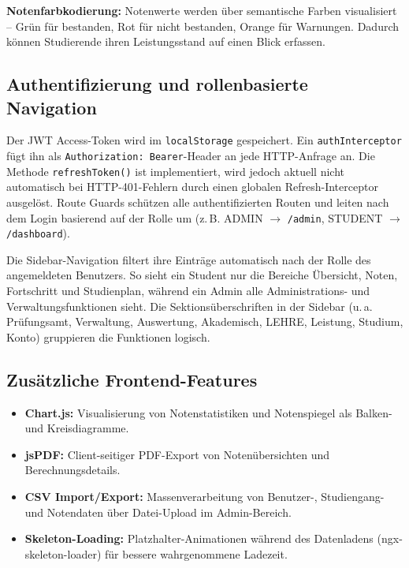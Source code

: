 \documentclass[12pt,a4paper,ngerman]{article}
\begin{document}
\textbf{Notenfarbkodierung:} Notenwerte werden über semantische Farben visualisiert -- Grün für bestanden, Rot für nicht bestanden, Orange für Warnungen. Dadurch können Studierende ihren Leistungsstand auf einen Blick erfassen.

\subsection{Authentifizierung und rollenbasierte Navigation}

Der JWT Access-Token wird im \texttt{localStorage} gespeichert. Ein \texttt{authInterceptor} fügt ihn als \texttt{Authorization: Bearer}-Header an jede HTTP-Anfrage an. Die Methode \texttt{refreshToken()} ist implementiert, wird jedoch aktuell nicht automatisch bei HTTP-401-Fehlern durch einen globalen Refresh-Interceptor ausgelöst. Route Guards schützen alle authentifizierten Routen und leiten nach dem Login basierend auf der Rolle um (z.\,B. ADMIN $\rightarrow$ \texttt{/admin}, STUDENT $\rightarrow$ \texttt{/dashboard}).

Die Sidebar-Navigation filtert ihre Einträge automatisch nach der Rolle des angemeldeten Benutzers. So sieht ein Student nur die Bereiche \glqq Übersicht\grqq{}, \glqq Noten\grqq{}, \glqq Fortschritt\grqq{} und \glqq Studienplan\grqq{}, während ein Admin alle Administrations- und Verwaltungsfunktionen sieht. Die Sektionsüberschriften in der Sidebar (u.\,a. \glqq Prüfungsamt\grqq{}, \glqq Verwaltung\grqq{}, \glqq Auswertung\grqq{}, \glqq Akademisch\grqq{}, \glqq LEHRE\grqq{}, \glqq Leistung\grqq{}, \glqq Studium\grqq{}, \glqq Konto\grqq{}) gruppieren die Funktionen logisch.

\subsection{Zusätzliche Frontend-Features}

\begin{itemize}[nosep]
\item \textbf{Chart.js:} Visualisierung von Notenstatistiken und Notenspiegel als Balken- und Kreisdiagramme.
\item \textbf{jsPDF:} Client-seitiger PDF-Export von Notenübersichten und Berechnungsdetails.
\item \textbf{CSV Import/Export:} Massenverarbeitung von Benutzer-, Studiengang- und Notendaten über Datei-Upload im Admin-Bereich.
\item \textbf{Skeleton-Loading:} Platzhalter-Animationen während des Datenladens (ngx-skeleton-loader) für bessere wahrgenommene Ladezeit.
\end{itemize}
\end{document}
